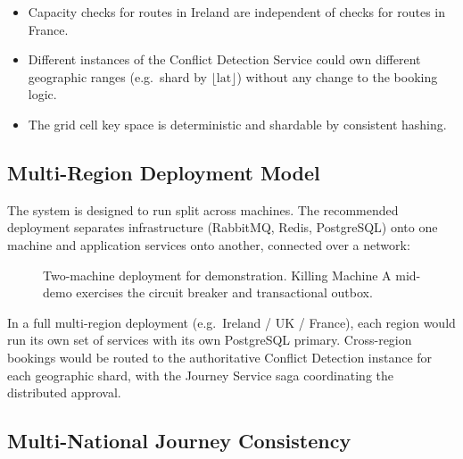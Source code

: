 \documentclass[12pt,a4paper]{article}
\begin{document}
\begin{itemize}[leftmargin=*]
  \item Capacity checks for routes in Ireland are independent of checks for routes in France.
  \item Different instances of the Conflict Detection Service could own different geographic ranges (e.g.\ shard by $\lfloor \text{lat} \rfloor$) without any change to the booking logic.
  \item The grid cell key space is deterministic and shardable by consistent hashing.
\end{itemize}

\subsection{Multi-Region Deployment Model}

The system is designed to run split across machines. The recommended deployment separates infrastructure (RabbitMQ, Redis, PostgreSQL) onto one machine and application services onto another, connected over a network:

\begin{figure}[H]
\centering
{}
\caption{Two-machine deployment for demonstration. Killing Machine A mid-demo exercises the circuit breaker and transactional outbox.}
\end{figure}

In a full multi-region deployment (e.g.\ Ireland / UK / France), each region would run its own set of services with its own PostgreSQL primary. Cross-region bookings would be routed to the authoritative Conflict Detection instance for each geographic shard, with the Journey Service saga coordinating the distributed approval.

\subsection{Multi-National Journey Consistency}
\end{document}
